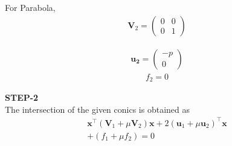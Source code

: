 \documentclass[10pt,a4paper]{report}
\newcommand{\myvec}[1]{\ensuremath{\begin{pmatrix}#1\end{pmatrix}}}
\let\vec\mathbf
\let\vec\mathbf
\providecommand{\brak}[1]{\ensuremath{\left(#1\right)}}
\begin{document}
\begin{multicols}{2}
For Parabola,\\\vspace{1mm}
\begin{align}
\vec{V}_2=\myvec{
0 & 0\\
0 & 1
}
\end{align} 

\begin{align}
\vec{u_2}= \myvec{
-p\\
0
}
\end{align} 
\begin{align}
f_2=0
\end{align} \vspace{2mm}

\textbf{STEP-2}\vspace{2mm}\\
The intersection of the given conics is obtained
as\\
\begin{align}
	\vec{x}^{\top}\brak{\vec{V}_1 + \mu\vec{V}_2}\vec{x}+2 \brak{\vec{u}_1+\mu \vec{u}_2}^{\top} \vec{x} 
	\\
	+ \brak{f_1+\mu f_2}= 0
    \end{align}
    

\end{multicols}
\end{document}

